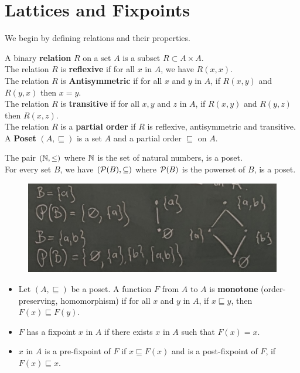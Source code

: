 {{\section{Lattices and Fixpoints}
We begin by defining relations and their properties. 
\begin{definition}
    A binary \textbf{relation} $R$ on a set $A$ is a subset $R \subset A\times A$. \\
    The relation $R$ is \textbf{reflexive} if for all $x$ in $A$, we have $R(x,x)$.\\
    The relation $R$ is \textbf{Antisymmetric} if for all $x$ and $y$ in $A$, if $R(x,y)$ and $R(y,x)$ then $x=y$. \\
    The relation $R$ is \textbf{transitive} if for all $x,y$ and $z$ in $A$, if $R(x,y)$ and $R(y,z)$ then $R(x,z)$.\\
    The relation $R$ is a \textbf{partial order} if $R$ is reflexive, antisymmetric and transitive. \\
    A \textbf{Poset} $(A,\sqsubseteq)$ is a set $A$ and a partial order $\sqsubseteq$ on $A$.
\end{definition}
\begin{example}
    The pair $(\N,\leq)$ where $\N$ is the set of natural numbers, is a poset.\\
    For every set $B$, we have $(\P(B),\subseteq)$ where $\P(B)$ is the powerset of $B$, is a poset.
    \begin{figure}[h]
        \centering
        \includegraphics[width=0.7\linewidth]{images/poset.png}
    \end{figure}
\end{example}
\begin{definition}
    \begin{itemize}
    \item Let $(A,\sqsubseteq)$ be a poset. A function $F$ from $A$ to $A$ is \textbf{monotone} (order-preserving, homomorphism) if for all $x$ and $y$ in $A$, if $x \sqsubseteq y$, then $F(x) \sqsubseteq F(y)$.
    \item $F$ has a fixpoint $x$ in $A$ if there exists $x$ in $A$ such that $F(x)=x$. 
    \item $x$ in $A$ is a pre-fixpoint of $F$ if $x \sqsubseteq F(x)$ and is a post-fixpoint of $F$, if $F(x) \sqsubseteq x$. 

\end{itemize}
\end{definition}}}
